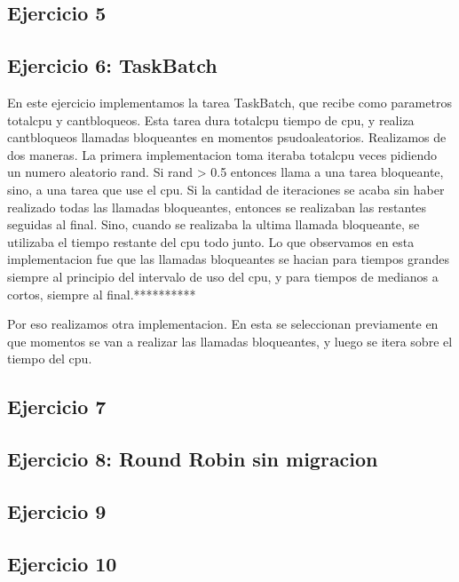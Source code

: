\subsection{Ejercicio 5}
\subsection{Ejercicio 6: TaskBatch}

En este ejercicio implementamos la tarea TaskBatch, que recibe como parametros totalcpu y cantbloqueos. Esta tarea dura totalcpu tiempo de 
cpu, y realiza cantbloqueos llamadas bloqueantes en momentos psudoaleatorios. Realizamos de dos maneras. La primera implementacion toma iteraba totalcpu
veces pidiendo un numero aleatorio rand. Si rand > 0.5 entonces llama a una tarea bloqueante, sino, a una tarea que use el cpu. Si la cantidad 
de iteraciones se acaba sin haber realizado todas las llamadas bloqueantes, entonces se realizaban las restantes seguidas al final. Sino, cuando se realizaba
la ultima llamada bloqueante, se utilizaba el tiempo restante del cpu todo junto. Lo que observamos en esta implementacion fue que las llamadas bloqueantes
se hacian para tiempos grandes siempre al principio del intervalo de uso del cpu, y para tiempos de medianos a cortos, siempre al final.**********

Por eso realizamos otra implementacion. En esta se seleccionan previamente en que momentos se van a realizar las llamadas bloqueantes, y luego se itera 
sobre el tiempo del cpu.


\subsection{Ejercicio 7}
\subsection{Ejercicio 8: Round Robin sin migracion}
\subsection{Ejercicio 9}
\subsection{Ejercicio 10}